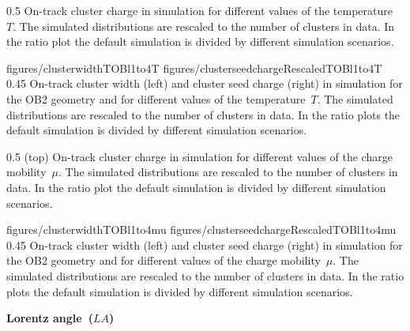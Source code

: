                  {0.5}       %
                 { On-track cluster charge in simulation for different values of the temperature~$T$.  The simulated distributions are rescaled to the number of clusters in data. In the ratio plot the default simulation is divided by different simulation scenarios. }

                 {figures/clusterwidthTOBl1to4T}
                 {figures/clusterseedchargeRescaledTOBl1to4T} %
                 {0.45}       %
                 {  On-track cluster width (left) and cluster seed charge (right) in simulation  for the OB2 geometry and for different values of the temperature~$T$.  The simulated distributions are rescaled to the number of clusters in data. In the ratio plots the default simulation is divided by different simulation scenarios. }

                 {0.5}       %
                 { (top) On-track cluster charge in simulation for different values of the charge mobility~$\mu$.  The simulated distributions are rescaled to the number of clusters in data. In the ratio plot the default simulation is divided by different simulation scenarios. }

                 {figures/clusterwidthTOBl1to4mu}
                 {figures/clusterseedchargeRescaledTOBl1to4mu} %
                 {0.45}       %
                 { On-track cluster width (left) and cluster seed charge (right) in simulation  for the OB2 geometry and for different values of the charge mobility~$\mu$.  The simulated distributions are rescaled to the number of clusters in data. In the ratio plots the default simulation is divided by different simulation scenarios. }

\textbf{Lorentz angle~($LA$)}


